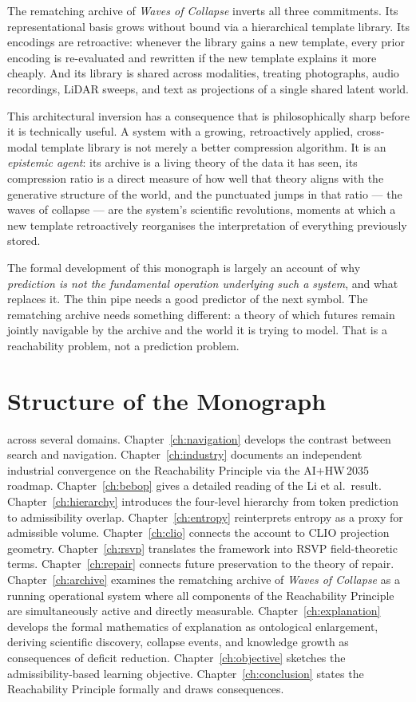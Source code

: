 \documentclass[11pt, a4paper, openany]{book}
\theoremstyle{plain}
\theoremstyle{definition}
\theoremstyle{remark}
\begin{document}
The rematching archive of \emph{Waves of Collapse} \cite{flyxion2026waves}
inverts all three commitments.
Its representational basis grows without bound via a hierarchical template library.
Its encodings are retroactive: whenever the library gains a new template,
every prior encoding is re-evaluated and rewritten if the new template
explains it more cheaply.
And its library is shared across modalities, treating photographs, audio
recordings, LiDAR sweeps, and text as projections of a single shared
latent world.

This architectural inversion has a consequence that is philosophically
sharp before it is technically useful.
A system with a growing, retroactively applied, cross-modal template library
is not merely a better compression algorithm.
It is an \emph{epistemic agent}: its archive is a living theory of the
data it has seen, its compression ratio is a direct measure of how well
that theory aligns with the generative structure of the world,
and the punctuated jumps in that ratio --- the waves of collapse ---
are the system's scientific revolutions, moments at which a new template
retroactively reorganises the interpretation of everything previously stored.

The formal development of this monograph is largely an account of why
\emph{prediction is not the fundamental operation underlying such a system},
and what replaces it.
The thin pipe needs a good predictor of the next symbol.
The rematching archive needs something different: a theory of which futures
remain jointly navigable by the archive and the world it is trying to model.
That is a reachability problem, not a prediction problem.

\section{Structure of the Monograph}
across several domains.
Chapter~\ref{ch:navigation} develops the contrast between search and navigation.
Chapter~\ref{ch:industry} documents an independent industrial convergence on the
Reachability Principle via the AI+HW\,2035 roadmap.
Chapter~\ref{ch:bebop} gives a detailed reading of the Li et al.\ result.
Chapter~\ref{ch:hierarchy} introduces the four-level hierarchy from
token prediction to admissibility overlap.
Chapter~\ref{ch:entropy} reinterprets entropy as a proxy for admissible volume.
Chapter~\ref{ch:clio} connects the account to CLIO projection geometry.
Chapter~\ref{ch:rsvp} translates the framework into RSVP field-theoretic terms.
Chapter~\ref{ch:repair} connects future preservation to the theory of repair.
Chapter~\ref{ch:archive} examines the rematching archive of \emph{Waves of Collapse}
as a running operational system where all components of the Reachability Principle
are simultaneously active and directly measurable.
Chapter~\ref{ch:explanation} develops the formal mathematics of explanation as
ontological enlargement, deriving scientific discovery, collapse events,
and knowledge growth as consequences of deficit reduction.
Chapter~\ref{ch:objective} sketches the admissibility-based learning objective.
Chapter~\ref{ch:conclusion} states the Reachability Principle formally and
draws consequences.
\end{document}
